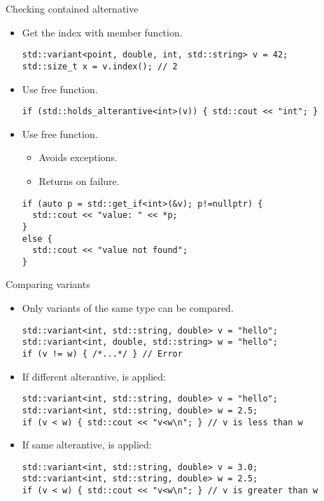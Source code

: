 \begin{frame}[t,fragile]{Checking contained alternative}
\begin{itemize}
  \item Get the index with  member function.
\begin{lstlisting}
std::variant<point, double, int, std::string> v = 42;
std::size_t x = v.index(); // 2
\end{lstlisting}

  \item Use  free function.
\begin{lstlisting}
if (std::holds_alterantive<int>(v)) { std::cout << "int"; }
\end{lstlisting}

  \item Use  free function.
    \begin{itemize}
      \item Avoids exceptions.
      \item Returns  on failure.
    \end{itemize}
\begin{lstlisting}
if (auto p = std::get_if<int>(&v); p!=nullptr) {
  std::cout << "value: " << *p;
}
else { 
  std::cout << "value not found"; 
}
\end{lstlisting}
\end{itemize}
\end{frame}

\begin{frame}[t,fragile]{Comparing variants}
\begin{itemize}
  \item Only variants of the same type can be compared.
\begin{lstlisting}
std::variant<int, std::string, double> v = "hello";
std::variant<int, double, std::string> w = "hello";
if (v != w) { /*...*/ } // Error
\end{lstlisting}

  \item If different alterantive,  is applied:
\begin{lstlisting}
std::variant<int, std::string, double> v = "hello";
std::variant<int, std::string, double> w = 2.5;
if (v < w) { std::cout << "v<w\n"; } // v is less than w
\end{lstlisting}

  \item If same alterantive,  is applied:
\begin{lstlisting}
std::variant<int, std::string, double> v = 3.0;
std::variant<int, std::string, double> w = 2.5;
if (v < w) { std::cout << "v<w\n"; } // v is greater than w
\end{lstlisting}

\end{itemize}
\end{frame}

